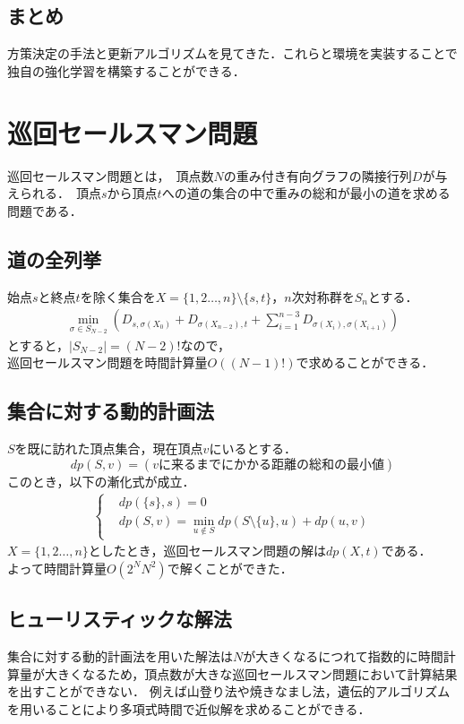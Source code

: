 \documentclass[a4paper,12pt]{jsreport}
\theoremstyle{definition}
\begin{document}
\section{まとめ}
方策決定の手法と更新アルゴリズムを見てきた．これらと環境を実装することで独自の強化学習を構築することができる．


\chapter{巡回セールスマン問題}
巡回セールスマン問題とは，\ 頂点数$N$の重み付き有向グラフの隣接行列$D$が与えられる．\ 頂点$s$から頂点$t$への道の集合の中で重みの総和が最小の道を求める問題である．
\section{道の全列挙}
始点$s$と終点$t$を除く集合を$X=\{1,2\ldots ,n\}\setminus\{s,t\}$，$n$次対称群を$S_n$とする．
\begin{eqnarray}
    \min_{\sigma\in S_{N-2}}
    \left(D_{s,\sigma(X_0)} + D_{\sigma(X_{n-2}),t} +
    \sum_{i=1}^{n-3}
        D_{\sigma(X_i),\sigma(X_{i+1})} 
    \right)
\end{eqnarray}
とすると，$|S_{N-2}|=(N-2)!$なので，\\ 巡回セールスマン問題を時間計算量$O((N-1)!)$で求めることができる．

\section{集合に対する動的計画法}
$S$を既に訪れた頂点集合，現在頂点$v$にいるとする．
$$dp(S,v)=(vに来るまでにかかる距離の総和の最小値)$$
このとき，以下の漸化式が成立．
\begin{eqnarray}
    \begin{cases}
        & dp(\{s\},s)=0\\
        & dp(S,v)=\min_{u \notin S}dp(S\setminus\{u\},u)+dp(u,v)
    \end{cases}
\end{eqnarray}
$X=\{1,2\ldots ,n\}$としたとき，巡回セールスマン問題の解は$dp(X,t)$である．\\
よって時間計算量$O(2^NN^2)$で解くことができた．
\section{ヒューリスティックな解法}
集合に対する動的計画法を用いた解法は$N$が大きくなるにつれて指数的に時間計算量が大きくなるため，頂点数が大きな巡回セールスマン問題において計算結果を出すことができない．
例えば山登り法や焼きなまし法，遺伝的アルゴリズムを用いることにより多項式時間で近似解を求めることができる．
\end{document}
